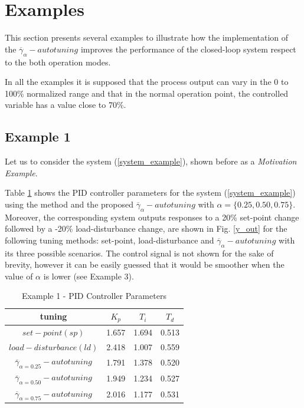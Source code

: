 %
\section{Examples}
\label{example}
%

This section presents several examples to illustrate how the
implementation of the $\overline{\gamma}_{\alpha}-autotuning$
improves the performance of the closed-loop system respect to the
both operation modes.

In all the examples it is supposed that the process output can
vary in the 0 to 100\% normalized range and that in the normal
operation point, the controlled variable has a value close to
70\%.

\subsection{Example 1}

Let us to consider the system (\ref{system_example}), shown before
as a \emph{Motivation Example}.

Table \ref{PID_parameters} shows the PID controller parameters for
the system (\ref{system_example}) using the
\cite{zhuangAthertonIEE1993} method and the proposed
$\overline{\gamma}_{\alpha}-autotuning$ with $\alpha=\{0.25, 0.50,
0.75\}$. Moreover, the corresponding system outputs responses to a
20\% set-point change followed by a -20\% load-disturbance change,
are shown in Fig. \ref{y_out} for the following tuning methods:
set-point, load-disturbance and
$\overline{\gamma}_{\alpha}-autotuning$ with its three possible
scenarios. The control signal is not shown for the sake of
brevity, however it can be easily guessed that it would be
smoother when the value of $\alpha$ is lower (see Example 3).

\begin{table}[h!]
\begin{center}
\caption{Example 1 - PID Controller Parameters}
\begin{tabular}{c|ccc}
\hline \textbf{tuning}               &$K_p$ &$T_i$ &$T_d$\\ \hline
$set-point(sp)$                               &1.657  &1.694  &0.513 \\
$load-disturbance(ld)$                        &2.418  &1.007  &0.559 \\
\hline
$\overline{\gamma}_{\alpha=0.25}-autotuning$  &1.791  &1.378  &0.520 \\
$\overline{\gamma}_{\alpha=0.50}-autotuning$  &1.949  &1.234  &0.527 \\
$\overline{\gamma}_{\alpha=0.75}-autotuning$  &2.016  &1.177  &0.531 \\
\hline
\end{tabular}
\label{PID_parameters}
\end{center}
\end{table}

